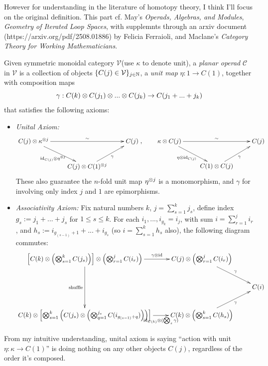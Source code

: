 \documentclass{article}
\begin{document}
However for understanding in the literature of homotopy theory, I think I'll focus on the original definition. This part cf. May's \emph{Operads, Algebras, and Modules}, \emph{Geometry of Iterated Loop Spaces}, with supplemnts through an arxiv document (https://arxiv.org/pdf/2508.01886) by Felicia Ferraioli, and Maclane's \emph{Category Theory for Working Mathematicians}.

\begin{defn}
Given symmetric monoidal category $\mathcal{V}$(use $\kappa$ to denote unit), a \emph{planar operad} $\mathcal{C}$ in $\mathcal{V}$ is a collection of objects $\{C(j)\in\mathcal{V}\}_{j\in\mathbb{N}}$, a \emph{unit map} $\eta:1\rightarrow C(1)$, together with composition maps
\[\gamma:C(k)\otimes C(j_1)\otimes...\otimes C(j_k)\rightarrow C(j_1+...+j_k)\]
that satisfies the following axioms:
\begin{itemize}
    \item \emph{Unital Axiom:}
    \[\xymatrix{
        C(j)\tensor \kappa^{\tensor j} \ar[dr]_-{\id_{C(j)}\tensor \eta^{\tensor j}} \ar[rr]^-{\sim} && C(j)\\
        & C(j)\tensor C(1)^{\tensor j} \ar[ur]_-{\gamma}
    },\quad\quad \xymatrix{
        \kappa\tensor C(j) \ar[dr]_-{\eta\tensor \id_{C(j)}} \ar[rr]^-{\sim} && C(j)\\
        & C(1)\tensor C(j) \ar[ur]_-{\gamma}
    }\]
    These also guarantee the $n$-fold unit map $\eta^{\otimes j}$ is a monomorphism, and $\gamma$ for involving only index $j$ and $1$ are epimorphisms.
    \item \emph{Associativity Axiom:} Fix natural numbers $k$, $j = \sum_{s=1}^k j_s$, define index $g_s:= j_1+...+j_s$ for $1\leq s\leq k$. For each $i_1,...,i_{g_k}=i_j$, with sum $i=\sum_{r=1}^j i_r$, and $h_s:= i_{g_{(s-1)}+1}+...+i_{g_s}$ (so $i=\sum_{s=1}^k h_s$ also), the following diagram commutes:
    \[\xymatrix{
        \left[C(k)\tensor \left(\bigtensor_{s=1}^k C(j_s)\right)\right]\tensor \left(\bigtensor_{r=1}^j C(i_r)\right) \ar[dd]_-{\text{shuffle}} \ar[r]^-{\gamma\tensor \id} & C(j) \tensor \left(\bigtensor_{r=1}^j C(i_r)\right) \ar[dr]^-{\gamma}\\
        && C(i)\\
        C(k) \tensor \left[\bigtensor_{s=1}^k \left(C(j_s)\tensor \left(\bigtensor_{q=1}^{j_s} C(i_{g_{(s-1)}+q})\right)\right)\right] \ar[r]_-{\id_{C(k)} \tensor (\bigtensor_s \gamma)} & C(k)\tensor \left(\bigtensor_{s=1}^k C(h_s)\right) \ar[ur]_-{\gamma}
    }\]
\end{itemize}
\end{defn}
From my intuitive understanding, unital axiom is saying ``action with unit $\eta:\kappa\rightarrow C(1)$'' is doing nothing on any other objects $C(j)$, regardless of the order it's composed. 
\end{document}
